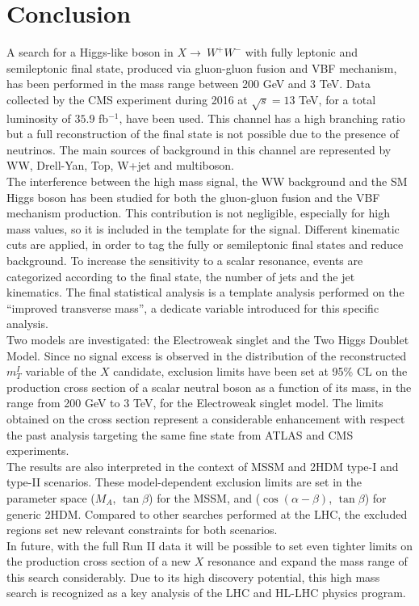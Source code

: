 \chapter*{Conclusion}
A search for a Higgs-like boson in $X \to \ W^+W^-$ with fully leptonic and semileptonic final state, produced via gluon-gluon fusion and VBF 
mechanism, has been performed in the mass range between 200 GeV and 3 TeV.
Data collected by the CMS experiment during 2016 at $\sqrt{s}=13$ TeV, for a total luminosity of $35.9$ fb$^{-1}$, have been used.
This channel has a high branching ratio but a full reconstruction of the final state is not possible due to the presence of neutrinos. 
The main sources of background in this channel are represented by WW, Drell-Yan, Top, W+jet and multiboson.\\
The interference between the high mass signal, the WW background and the SM Higgs boson has been studied for both the gluon-gluon fusion and the VBF mechanism production.
This contribution is not negligible, especially for high mass values, so it is included in the template for the signal.
Different kinematic cuts are applied, in order to tag the fully or semileptonic final states and reduce background. 
To increase the sensitivity to a scalar resonance, events are categorized according to the final state, the number of jets 
and the jet kinematics. 
The final statistical analysis is a template analysis performed on the ``improved transverse mass'', a dedicate variable
introduced for this specific analysis.\\
Two models are investigated: the Electroweak singlet and the Two Higgs Doublet Model.
Since no signal excess is observed in the distribution of the reconstructed $m_T^I$ variable of the $X$ candidate,  
exclusion limits have been set at 95\% CL on the production cross section of a scalar neutral boson
as a function of its mass, in the range from 200 GeV to 3 TeV, for the Electroweak singlet model.
The limits obtained on the cross section represent a considerable enhancement with respect the past analysis 
targeting the same fine state from ATLAS and CMS experiments.\\
The results are also interpreted in the context of MSSM and  2HDM type-I and type-II scenarios.  
These model-dependent exclusion limits are set in the parameter space ($M_A$, $\tan \beta$) for the MSSM, and ($\cos(\alpha - \beta)$, $\tan \beta$) for generic
2HDM. Compared to other searches performed at the LHC, the excluded regions set new relevant constraints for both scenarios.\\
In future, with the full Run II data it will be possible to set even tighter limits on the
production cross section of a new $X$ resonance and expand the mass range
of this search considerably. Due to its high discovery potential, this high mass search is recognized as a key analysis of the LHC and HL-LHC physics
program.












